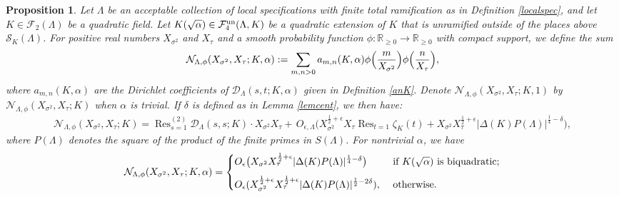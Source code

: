 \documentclass[10pt]{article}
\theoremstyle{plain}
\newtheorem{prop}[thm]{Proposition}
\theoremstyle{definition}
\theoremstyle{remark}
\DeclareMathOperator{\Res}{Res}
\def\un{{\rm un}}
\def\bR{{\mathbb R}}
\def\cD{{\mathcal D}}
\def\cF{{\mathcal F}}
\def\cN{{\mathcal N}}
\def\cS{{\mathcal S}}
\begin{document}
\begin{prop}\label{propddsasymp}
Let $\Lambda$ be an acceptable collection of local 
specifications with finite total ramification as in Definition \ref{localspec}, and let $K \in
\cF_2(\Lambda)$ be a quadratic field. Let $K(\sqrt{\alpha}) \in
\cF_4^{\un}(\Lambda,K)$ be a quadratic extension of $K$ that is
unramified outside of the places above $\cS_K(\Lambda)$. For positive
real numbers $X_{\sigma^2}$ and $X_\tau$ and a smooth probability function $\phi: \bR_{\geq 0} \rightarrow \bR_{\geq 0}$ with compact support, we define the sum
\begin{equation}\label{twovardirichlet}
\cN_{\Lambda,\phi}(X_{\sigma^2},X_\tau;K,\alpha):=
\displaystyle\sum_{m,n>0}a_{m,n}(K,\alpha)
\phi\Bigl(\frac{m}{X_{\sigma^2}}\Bigr)\phi\Bigl(\frac{n}{X_\tau}\Bigr),
\end{equation}
where $a_{m,n}(K,\alpha)$ are the Dirichlet coefficients of $\cD_\Lambda(s,t; K,\alpha) $ given in Definition \ref{anK}. Denote 
$\cN_{\Lambda,\phi}(X_{\sigma^2},X_\tau;K,1)$ by
$\cN_{\Lambda,\phi}(X_{\sigma^2},X_\tau;K)$ when $\alpha$ is
trivial. If $\delta$ is defined as in Lemma \ref{lemcent}, we then have:
\begin{equation*}
\begin{array}{rcl}
  \cN_{\Lambda,\phi}(X_{\sigma^2},X_\tau;K)
=\Res^{(2)}_{s=1}\cD_\Lambda(s,s;K)\cdot X_{\sigma^2}X_\tau
+\, O_{\epsilon,\Lambda}\bigl(
X_{\sigma^2}^{\frac12+\epsilon}X_\tau\Res_{t=1}\zeta_K(t)
+X_{\sigma^2}X_\tau^{\frac12+\epsilon}
|\Delta(K)P(\Lambda)|^{\frac14-\delta}\bigr),
\end{array}
\end{equation*}
where $P(\Lambda)$ denotes the square of the product of the finite primes in $S(\Lambda)$. 
For nontrivial $\alpha$, we have 
\begin{equation*}
\cN_{\Lambda,\phi}(X_{\sigma^2}, X_\tau;K,\alpha) = \begin{cases}
O_\epsilon\bigl(X_{\sigma^2}X_\tau^{\frac12+\epsilon}
|\Delta(K)P(\Lambda)|^{\frac14-\delta}\bigr)
&\mbox{ if $K(\sqrt{\alpha})$ is biquadratic;} \vspace{.1in}\\
\displaystyle O_\epsilon(X_{\sigma^2}^{\frac12+\epsilon}X_{\tau}^{\frac12+\epsilon}
|\Delta(K)P(\Lambda)|^{\frac12-2\delta}), &\mbox{ otherwise.}
\end{cases}
\end{equation*}
\end{prop}
\end{document}
